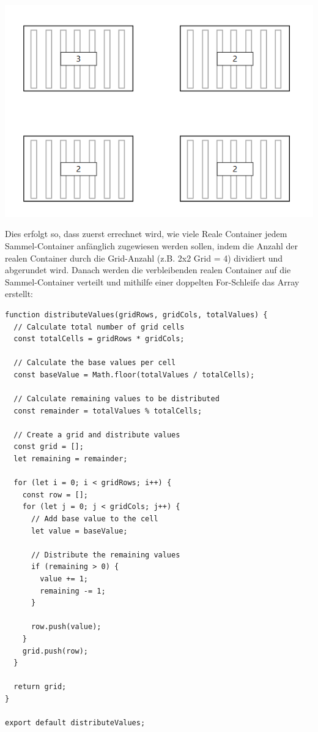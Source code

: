\documentclass[
    headings=optiontotocandhead,%
    twoside,
    numbers=noenddot,%
    12pt, %
    titlepage, %
    parskip=full, %
    listof=leveldown, 
    numbers=noenddot, %
    a4paper,DIV=14,
    BCOR=15mm,
]{scrbook}
\let\origfigure=\figure
\let\endorigfigure=\endfigure
\renewenvironment{figure}[1][]{%
   \origfigure[H]
}{%
   \endorigfigure
}
\begin{document}
\begin{figure}
\centering
\includegraphics{img/Gekle/GridExample.PNG}
\caption{Wie das 2x2 Grid laut obigen Angaben auf der Website aussieht}
\end{figure}

Dies erfolgt so, dass zuerst errechnet wird, wie viele Reale Container
jedem Sammel-Container anfänglich zugewiesen werden sollen, indem die
Anzahl der realen Container durch die Grid-Anzahl (z.B. 2x2 Grid = 4)
dividiert und abgerundet wird. Danach werden die verbleibenden realen
Container auf die Sammel-Container verteilt und mithilfe einer doppelten
For-Schleife das Array erstellt:

\begin{lstlisting}[caption={Code des ContainerDistributor Skripts}]
function distributeValues(gridRows, gridCols, totalValues) {
  // Calculate total number of grid cells
  const totalCells = gridRows * gridCols;

  // Calculate the base values per cell
  const baseValue = Math.floor(totalValues / totalCells);

  // Calculate remaining values to be distributed
  const remainder = totalValues % totalCells;

  // Create a grid and distribute values
  const grid = [];
  let remaining = remainder;

  for (let i = 0; i < gridRows; i++) {
    const row = [];
    for (let j = 0; j < gridCols; j++) {
      // Add base value to the cell
      let value = baseValue;

      // Distribute the remaining values
      if (remaining > 0) {
        value += 1;
        remaining -= 1;
      }

      row.push(value);
    }
    grid.push(row);
  }

  return grid;
}

export default distributeValues;
\end{lstlisting}
\end{document}
